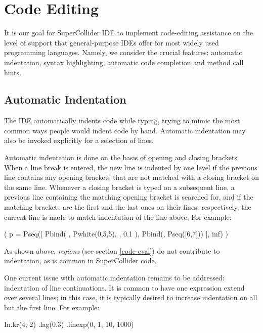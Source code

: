 \documentclass[11pt,a4paper]{article}
\begin{document}
\section{Code Editing}

It is our goal for SuperCollider IDE to implement code-editing assistance on the level of support
that general-purpose IDEs offer for most widely used programming languages. Namely,
we consider the crucial features: automatic indentation, syntax highlighting, automatic code completion and method call
hints.

\subsection{Automatic Indentation}
\label{auto-indentation}

The IDE automatically indents code while typing, trying to mimic the most common ways people would indent code by hand.
Automatic indentation may also be invoked explicitly for a selection of lines.

Automatic indentation is done on the basis of opening and closing brackets. When a line break is entered, the new line
is indented by one level if the previous line contains any opening brackets that are not matched with a closing bracket
on the same line. Whenever a closing bracket is typed on a subsequent line, a previous line containing the matching
opening bracket is searched for, and if the matching brackets are the first and the last ones on their lines,
respectively, the current line is made to match indentation of the line above. For example:

\begin{verbatimtab}[4]
(
p = Pseq([
	Pbind(
		\degree, Pwhite(0,5,5),
		\dur, 0.1
	),
	Pbind(\degree, Pseq([6,7]))
], inf)
)
\end{verbatimtab}

As shown above, \emph{regions} (see section \ref{code-eval}) do not contribute to indentation, as is common in
SuperCollider code.

One current issue with automatic indentation remains to be addressed: indentation of line continuations. It is common
to have one expression extend over several lines; in this case, it is typically desired to increase indentation on all
but the first line. For example:

\begin{verbatimtab}[4]
In.kr(4, 2)
	.lag(0.3)
	.linexp(0, 1, 10, 1000)
\end{verbatimtab}
\end{document}
